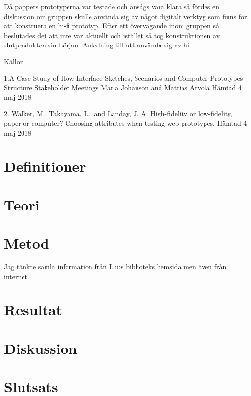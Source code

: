  

Då pappers prototyperna var testade och ansågs vara klara så fördes en diskussion om gruppen skulle använda sig av något digitalt verktyg som finns för att konstruera en hi-fi prototyp. Efter ett övervägande inom gruppen så beslutades det att inte var aktuellt och istället så tog konstruktionen av slutprodukten sin början. Anledning till att använda sig av hi   

Källor


1.A Case Study of How Interface Sketches, Scenarios and Computer Prototypes Structure Stakeholder Meetings Maria Johanson and Mattias Arvola Hämtad 4 maj 2018

2. Walker, M., Takayama, L., and Landay, J. A. High-fidelity or low-fidelity, paper or computer? Choosing attributes when testing web prototypes. Hämtad 4 maj 2018 

\section{Definitioner}
  

\section{Teori}
\section{Metod}
Jag tänkte samla information från Liu:s biblioteks hemsida men även från internet. 
\section{Resultat}
\section{Diskussion}
\section{Slutsats}